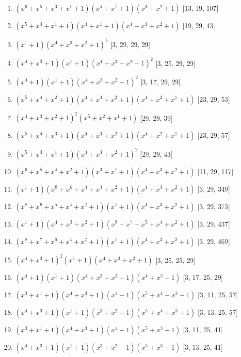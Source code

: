 \documentclass[10pt,twocolumn]{article}
\begin{document}
\begin{enumerate}
\item $(x^{6} + x^{5} + x^{3} + x^{1} + 1)(x^{4} + x^{1} + 1)(x^{3} + x^{2} + 1)$  [13, 19, 107]
\item $(x^{5} + x^{3} + x^{1} + 1)(x^{4} + x^{1} + 1)(x^{4} + x^{3} + x^{2} + 1)$  [19, 29, 43]
\item $(x^{1} + 1)(x^{4} + x^{3} + x^{2} + 1)^{3}$  [3, 29, 29, 29]
\item $(x^{4} + x^{3} + 1)(x^{1} + 1)(x^{4} + x^{3} + x^{2} + 1)^{2}$  [3, 25, 29, 29]
\item $(x^{4} + 1)(x^{1} + 1)(x^{4} + x^{3} + x^{2} + 1)^{2}$  [3, 17, 29, 29]
\item $(x^{5} + x^{4} + x^{2} + 1)(x^{4} + x^{3} + x^{2} + 1)(x^{4} + x^{2} + x^{1} + 1)$  [23, 29, 53]
\item $(x^{4} + x^{3} + x^{2} + 1)^{2}(x^{5} + x^{2} + x^{1} + 1)$  [29, 29, 39]
\item $(x^{5} + x^{4} + x^{3} + 1)(x^{4} + x^{3} + x^{2} + 1)(x^{4} + x^{2} + x^{1} + 1)$  [23, 29, 57]
\item $(x^{5} + x^{3} + x^{1} + 1)(x^{4} + x^{3} + x^{2} + 1)^{2}$  [29, 29, 43]
\item $(x^{6} + x^{5} + x^{4} + x^{2} + 1)(x^{3} + x^{1} + 1)(x^{4} + x^{3} + x^{2} + 1)$  [11, 29, 117]
\item $(x^{1} + 1)(x^{8} + x^{6} + x^{4} + x^{3} + x^{2} + 1)(x^{4} + x^{3} + x^{2} + 1)$  [3, 29, 349]
\item $(x^{8} + x^{6} + x^{5} + x^{4} + x^{2} + 1)(x^{1} + 1)(x^{4} + x^{3} + x^{2} + 1)$  [3, 29, 373]
\item $(x^{1} + 1)(x^{4} + x^{3} + x^{2} + 1)(x^{8} + x^{7} + x^{5} + x^{4} + x^{2} + 1)$  [3, 29, 437]
\item $(x^{8} + x^{7} + x^{6} + x^{4} + x^{2} + 1)(x^{1} + 1)(x^{4} + x^{3} + x^{2} + 1)$  [3, 29, 469]
\item $(x^{4} + x^{3} + 1)^{2}(x^{1} + 1)(x^{4} + x^{3} + x^{2} + 1)$  [3, 25, 25, 29]
\item $(x^{4} + 1)(x^{1} + 1)(x^{4} + x^{3} + x^{2} + 1)(x^{4} + x^{3} + 1)$  [3, 17, 25, 29]
\item $(x^{3} + x^{1} + 1)(x^{4} + x^{3} + 1)(x^{1} + 1)(x^{5} + x^{4} + x^{3} + 1)$  [3, 11, 25, 57]
\item $(x^{4} + x^{3} + 1)(x^{1} + 1)(x^{3} + x^{2} + 1)(x^{5} + x^{4} + x^{3} + 1)$  [3, 13, 25, 57]
\item $(x^{3} + x^{1} + 1)(x^{4} + x^{3} + 1)(x^{1} + 1)(x^{5} + x^{3} + 1)$  [3, 11, 25, 41]
\item $(x^{4} + x^{3} + 1)(x^{1} + 1)(x^{3} + x^{2} + 1)(x^{5} + x^{3} + 1)$  [3, 13, 25, 41]

\end{enumerate}
\end{document}
